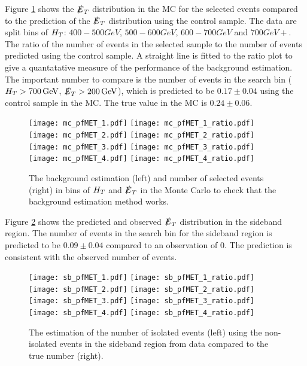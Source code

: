 Figure \ref{fig:Bkgd_Est_MC} shows the $\slashed{E}_{T}$ distribution in the MC for the 
selected events compared to the prediction of the $\slashed{E}_{T}$ distribution using the 
control sample. The data are split bins of $H_{T}$: $400-500\unit{GeV}$, 
$500-600\unit{GeV}$, $600-700\unit{GeV}$ and $700\unit{GeV}+$. The ratio of the 
number of events in the selected sample to the number of events predicted using 
the control sample. A straight line is fitted to the ratio plot to give a 
quantatative measure of the performance of the background estimation. The 
important number to compare is the number of events in the search bin
($H_{T}>700\, \mathrm{GeV}$, $\slashed{E}_{T}>200\, \mathrm{GeV}$), which is predicted to be 
$0.17\pm0.04$ using the control sample in the MC. The true value in the MC is 
$0.24\pm0.06$. \\

\begin{figure}
\texttt{[image: mc\_pfMET\_1.pdf]}
\texttt{[image: mc\_pfMET\_1\_ratio.pdf]}\\
\texttt{[image: mc\_pfMET\_2.pdf]}
\texttt{[image: mc\_pfMET\_2\_ratio.pdf]}\\
\texttt{[image: mc\_pfMET\_3.pdf]}
\texttt{[image: mc\_pfMET\_3\_ratio.pdf]}\\
\texttt{[image: mc\_pfMET\_4.pdf]}
\texttt{[image: mc\_pfMET\_4\_ratio.pdf]}\\
\caption{The background estimation (left) and number of selected events (right) 
in bins of $H_{T}$ and $\slashed{E}_{T}$ in the Monte Carlo to check that the background
estimation method works.}
\label{fig:Bkgd_Est_MC}
\end{figure}

Figure \ref{fig:Bkgd_Est_Sideband} shows the predicted and observed $\slashed{E}_{T}$ 
distribution in the sideband region. The number of events in the search bin for
the sideband region is predicted to be $0.09\pm0.04$ compared to an observation of
0. The prediction is consistent with the observed number of events. \\

\begin{figure}
\texttt{[image: sb\_pfMET\_1.pdf]}
\texttt{[image: sb\_pfMET\_1\_ratio.pdf]}\\
\texttt{[image: sb\_pfMET\_2.pdf]}
\texttt{[image: sb\_pfMET\_2\_ratio.pdf]}\\
\texttt{[image: sb\_pfMET\_3.pdf]}
\texttt{[image: sb\_pfMET\_3\_ratio.pdf]}\\
\texttt{[image: sb\_pfMET\_4.pdf]}
\texttt{[image: sb\_pfMET\_4\_ratio.pdf]}\\
\caption{The estimation of the number of isolated events (left) using the
non-isolated events in the sideband region from data compared to the true number
(right).}
\label{fig:Bkgd_Est_Sideband}
\end{figure}

